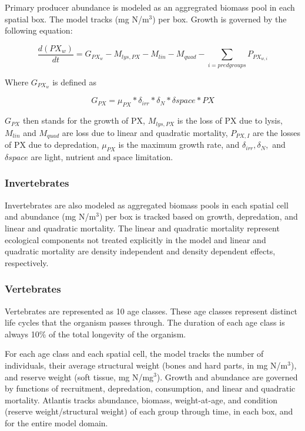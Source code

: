 \documentclass{report}
\begin{document}
Primary producer abundance is modeled as an aggregrated biomass pool in each spatial box. The model tracks (mg N/m$^3$) per box. Growth is governed by the following equation:

\begin{equation}
\frac{d(PX_w)}{dt} = G_{PX_w} - M_{lys,PX} - M_{lin} - M_{quad} - \sum_{i = pred groups}{P_{PX_{w,i}}}
\end{equation}

Where $G_{PX_w}$ is defined as

\begin{equation}
G_{PX} = \mu_{PX} * \delta_{irr} * \delta_{N} * \delta{space} * PX
\end{equation}

$G_{PX}$ then stands for the growth of PX, $M_{lys,PX}$ is the loss of PX due to lysis, $M_{lin}$ and $M_{quad}$ are loss due to linear and quadratic mortality, $P_{PX,I}$ are the losses of PX due to depredation, $\mu_{PX}$ is the maximum growth rate, and $\delta_{irr}, \delta_{N},$ and $\delta{space}$ are light, nutrient and space limitation. 

\subsubsection{Invertebrates}

Invertebrates are also modeled as aggregated biomass pools in each spatial cell and abundance (mg N/m$^3$) per box is tracked based on growth, depredation, and linear and quadratic mortality. The linear and quadratic mortality represent ecological components not treated explicitly in the model and linear and quadratic mortality are density independent and density dependent effects, respectively. 

\subsubsection{Vertebrates}

Vertebrates are represented as 10 age classes. These age classes represent distinct life cycles that the organism passes through. The duration of each age class is always 10\% of the total longevity of the organism. 

For each age class and each spatial cell, the model tracks the number of individuals, their average structural weight (bones and hard parts, in mg N/m$^3$), and reserve weight (soft tissue, mg N/mg$^3$). Growth and abundance are governed by functions of recruitment, depredation, consumption, and linear and quadratic mortality. Atlantis tracks abundance, biomass, weight-at-age, and condition (reserve weight/structural weight) of each group through time, in each box, and for the entire model domain.
\end{document}
